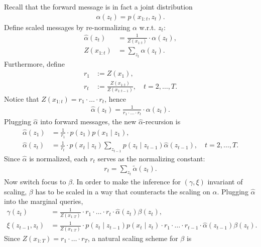 \documentclass[a3paper,12pt]{extarticle} %
\begin{document}
\begin{enumerate}
\begin{enumerate}
    Recall that the forward message is in fact a joint distribution
    \begin{align}
        \alpha(z_t) = p(x_{1:t}, z_t). \tag{30}
    \end{align}
    Define scaled messages by re-normalizing $\alpha$ w.r.t. $z_t$:
    \begin{align}
        \hat{\alpha}(z_t) &= \frac{1}{Z(x_{1:t})} \cdot \alpha(z_t), \tag{31} \\
        Z(x_{1:t}) &= \sum_{z_t} \alpha(z_t). \tag{32}
    \end{align}
    Furthermore, define
    \begin{align}
        r_1 &:= Z(x_1), \tag{33} \\
        r_t &:= \frac{Z(x_{1:t})}{Z(x_{1:t-1})}, \quad t = 2, \ldots, T. \tag{34}
    \end{align}
    Notice that $Z(x_{1:t}) = r_1 \cdot \ldots \cdot r_t$, hence
    \begin{align}
        \hat{\alpha}(z_t) = \frac{1}{r_1 \cdot \ldots \cdot r_t} \cdot \alpha(z_t). \tag{35}
    \end{align}
    Plugging $\hat{\alpha}$ into forward messages, the new $\hat{\alpha}$-recursion is
    \begin{align}
        \hat{\alpha}(z_1) &= \frac{1}{r_1} \cdot p(z_1)p(x_1 \mid z_1), \tag{36} \\
        \hat{\alpha}(z_t) &= \frac{1}{r_t} \cdot p(x_t \mid z_t) \sum_{z_{t-1}} p(z_t \mid z_{t-1}) \hat{\alpha}(z_{t-1}), \quad t = 2, \ldots, T. \tag{37}
    \end{align}
    Since $\hat{\alpha}$ is normalized, each $r_t$ serves as the normalizing constant:
    \begin{align}
        r_t = \sum_{z_t} \tilde{\alpha}(z_t). \tag{38}
    \end{align}
    Now switch focus to $\beta$. In order to make the inference for $(\gamma, \xi)$ invariant of scaling, $\beta$ has to be scaled in a way that counteracts the scaling on $\alpha$. Plugging $\hat{\alpha}$ into the marginal queries,
    \begin{align}
        \gamma(z_t) &= \frac{1}{Z(x_{1:T})} \cdot r_1 \cdot \ldots \cdot r_t \cdot \hat{\alpha}(z_t) \beta(z_t), \tag{39} \\
        \xi(z_{t-1}, z_t) &= \frac{1}{Z(x_{1:T})} \cdot p(z_t \mid z_{t-1}) p(x_t \mid z_t) \cdot r_1 \cdot \ldots \cdot r_{t-1} \cdot \hat{\alpha}(z_{t-1}) \beta(z_t). \tag{40}
    \end{align}
    Since $Z(x_{1:T}) = r_1 \cdot \ldots \cdot r_T$, a natural scaling scheme for $\beta$ is

\end{enumerate}
\end{enumerate}
\end{document}
